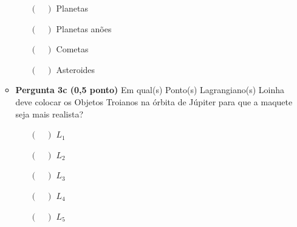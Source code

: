 \documentclass[a4paper, 12pt]{article}
\begin{document}
\begin{flushleft}
\begin{itemize}
\begin{itemize}
					\begin{itemize}
						\item[$(\quad)$] Planetas
						\item[$(\quad)$] Planetas anões
						\item[$(\quad)$] Cometas
						\item[$(\quad)$] Asteroides
					\end{itemize}
				\item \textbf{Pergunta 3c (0,5 ponto)} Em qual(s) Ponto(s) Lagrangiano(s) Loinha deve colocar os Objetos Troianos na órbita de Júpiter para que a maquete seja mais realista?
					\begin{itemize}
						\item[$(\quad)$] $L_1$
						\item[$(\quad)$] $L_2$
						\item[$(\quad)$] $L_3$
						\item[$(\quad)$] $L_4$
						\item[$(\quad)$] $L_5$
					\end{itemize}
			\end{itemize}
			

\end{itemize}
\end{flushleft}
\end{document}
